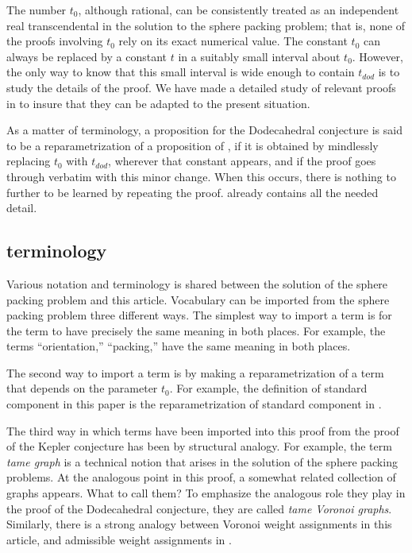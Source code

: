 The number $t_0$, although rational, 
can be consistently treated as an independent real transcendental 
in the solution to the sphere packing problem; that is,
none of the proofs involving $t_0$ rely on its exact numerical value.
The constant $t_0$ can always be replaced by a constant $t$
in a suitably small interval about $t_0$.  However, the only way to
know that this small interval is wide enough to contain $t_{dod}$ is to study the
details of the proof.  We have made 
a detailed study of relevant proofs in \cite{DCG} to insure that
they can be adapted to the present situation.

As a matter of terminology, a proposition for the Dodecahedral conjecture
is said to be a reparametrization of a proposition of \cite{DCG},
if it is obtained by mindlessly replacing $t_0$ with $t_{dod}$, wherever that constant appears, and if the proof goes through verbatim with this minor change.
When this occurs, 
there is nothing to further to be learned by repeating the proof.
 \cite{DCG} already contains all the needed detail.

\subsection{terminology}

Various notation and terminology is shared between the solution
of the sphere packing problem and this article.  
Vocabulary can be imported from the sphere packing problem three
different ways.  The simplest way to import a term is for the
term to have precisely the same meaning in both places.  For
example, the terms ``orientation,'' ``packing,'' have the
same meaning in both places. 

The second way to import a term is by making a reparametrization of a term that depends on the parameter $t_0$.  For example, the definition 
of standard component in this paper
is the reparametrization of standard component in \cite{DCG}.

The third way in which terms have been imported into this proof
from the proof of the Kepler conjecture has been by structural
analogy.  For example,
the term {\it tame graph} is a technical notion that arises in
the solution of the sphere packing problems.  At the analogous
point in this proof, a somewhat related collection of graphs
appears.
What to call them?  To emphasize the  analogous role they play
in the proof of the Dodecahedral conjecture, they
are called {\it tame Voronoi graphs}.  Similarly, there
is a strong analogy between Voronoi weight assignments in this
article, and admissible weight assignments in \cite{DCG}.

